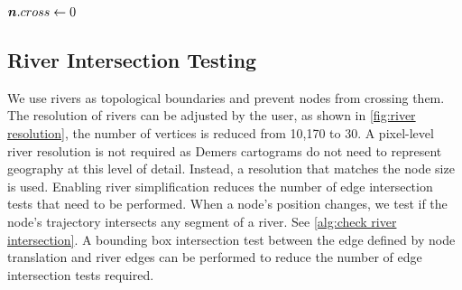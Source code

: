 \begin{algorithm}[tb!]
\begin{algorithmic}[1]
                            \Else

                                \State {}
                                \State $ \bm{n}.cross \gets 0 $ 

                            \EndIf
                            
                        \EndIf

                    \EndIf

                \EndFor
        \State {}
        \EndProcedure
    \end{algorithmic}
\end{algorithm}

\color{black}



\subsection{River Intersection Testing}

We use rivers as topological boundaries and prevent nodes from crossing them. The resolution of rivers can be adjusted by the user, as shown in \autoref{fig:river resolution}, the number of vertices is reduced from 10,170 to 30. A pixel-level river resolution is not required as Demers cartograms do not need to represent geography at this level of detail. Instead, a resolution that matches the node size is used. Enabling river simplification reduces the number of edge intersection tests that need to be performed. When a node's position changes, we test if the node's trajectory intersects any segment of a river. See \autoref{alg:check river intersection}. A bounding box intersection test between the edge defined by node translation and river edges can be performed to reduce the number of edge intersection tests required.


